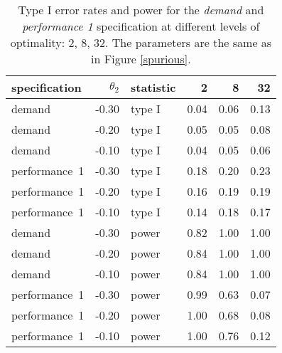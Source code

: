 \begin{table}[ht]
\centering
\begingroup\footnotesize
\begin{tabular}{lrlrrr}
  \hline
specification & $\theta_2$ & statistic & 2 & 8 & 32 \\ 
  \hline
demand & -0.30 & type I & 0.04 & 0.06 & 0.13 \\ 
  demand & -0.20 & type I & 0.05 & 0.05 & 0.08 \\ 
  demand & -0.10 & type I & 0.04 & 0.05 & 0.06 \\ 
  performance~1 & -0.30 & type I & 0.18 & 0.20 & 0.23 \\ 
  performance~1 & -0.20 & type I & 0.16 & 0.19 & 0.19 \\ 
  performance~1 & -0.10 & type I & 0.14 & 0.18 & 0.17 \\ 
  demand & -0.30 & power & 0.82 & 1.00 & 1.00 \\ 
  demand & -0.20 & power & 0.84 & 1.00 & 1.00 \\ 
  demand & -0.10 & power & 0.84 & 1.00 & 1.00 \\ 
  performance~1 & -0.30 & power & 0.99 & 0.63 & 0.07 \\ 
  performance~1 & -0.20 & power & 1.00 & 0.68 & 0.08 \\ 
  performance~1 & -0.10 & power & 1.00 & 0.76 & 0.12 \\ 
   \hline
\end{tabular}
\endgroup
\caption{Type I error rates and power for the \emph{demand} and
             \emph{performance 1} specification at different levels of 
             optimality: 2, 8, 32. The parameters are the same as in Figure 
             \ref{spurious}.} 
\label{spurious-table}
\end{table}
